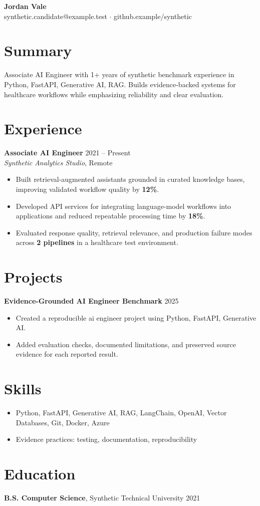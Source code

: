\documentclass[10pt,letterpaper]{article}
\begin{document}
\begin{center}
{\Large \textbf{Jordan Vale}}\\
synthetic.candidate@example.test $\cdot$ github.example/synthetic
\end{center}

\section*{Summary}
Associate AI Engineer with 1+ years of synthetic benchmark experience in Python, FastAPI, Generative AI, RAG. Builds evidence-backed systems for healthcare workflows while emphasizing reliability and clear evaluation.

\section*{Experience}
\textbf{Associate AI Engineer} \hfill 2021 -- Present\\
\textit{Synthetic Analytics Studio}, Remote
\begin{itemize}
  \item Built retrieval-augmented assistants grounded in curated knowledge bases, improving validated workflow quality by \textbf{12\%}.
  \item Developed API services for integrating language-model workflows into applications and reduced repeatable processing time by \textbf{18\%}.
  \item Evaluated response quality, retrieval relevance, and production failure modes across \textbf{2 pipelines} in a healthcare test environment.
\end{itemize}

\section*{Projects}
\textbf{Evidence-Grounded AI Engineer Benchmark} \hfill 2025
\begin{itemize}
  \item Created a reproducible ai engineer project using Python, FastAPI, Generative AI.
  \item Added evaluation checks, documented limitations, and preserved source evidence for each reported result.
\end{itemize}

\section*{Skills}
\begin{itemize}
  \item Python, FastAPI, Generative AI, RAG, LangChain, OpenAI, Vector Databases, Git, Docker, Azure
  \item Evidence practices: testing, documentation, reproducibility
\end{itemize}

\section*{Education}
\textbf{B.S. Computer Science}, Synthetic Technical University \hfill 2021
\end{document}
